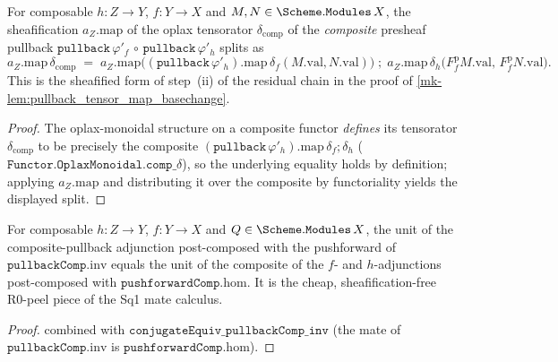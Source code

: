 \begin{lemma}\label{mk-lem:sheafifymap_deltacomp_split}
  \leanok

  For composable \(h : Z \to Y\), \(f : Y \to X\) and \(M, N \in \Scheme.\mathtt{Modules}\,X\),
  the sheafification \(a_Z.\mathrm{map}\) of the oplax tensorator \(\delta_{\mathrm{comp}}\) of
  the \emph{composite} presheaf pullback \(\mathtt{pullback}\,\varphi'_{f} \,\circ\,
  \mathtt{pullback}\,\varphi'_{h}\) splits as
  \[
    a_Z.\mathrm{map}\,\delta_{\mathrm{comp}}
      \;=\; a_Z.\mathrm{map}\bigl((\mathtt{pullback}\,\varphi'_{h}).\mathrm{map}\,
            \delta_{f}(M.\mathrm{val}, N.\mathrm{val})\bigr)
        \;\mathbin{;}\;
        a_Z.\mathrm{map}\,\delta_{h}\bigl(F^{\mathrm p}_{f}M.\mathrm{val},\,
            F^{\mathrm p}_{f}N.\mathrm{val}\bigr).
  \]
  This is the sheafified form of step~(ii) of the residual chain in the proof of
  \ref{mk-lem:pullback_tensor_map_basechange}.
\end{lemma}
\begin{proof}
  \leanok
  The oplax-monoidal structure on a composite functor \emph{defines} its tensorator
  \(\delta_{\mathrm{comp}}\) to be precisely the composite
  \((\mathtt{pullback}\,\varphi'_{h}).\mathrm{map}\,\delta_{f} \mathbin{;} \delta_{h}\)
  (\(\mathtt{Functor.OplaxMonoidal.comp\_}\delta\)), so the underlying equality holds
  by definition; applying \(a_Z.\mathrm{map}\) and distributing it over the composite by
  functoriality yields the displayed split.
\end{proof}

\begin{lemma}\label{mk-lem:sheaf_unit_comp_pushforward_pullbackcomp_inv}
  \leanok

  For composable \(h : Z \to Y\), \(f : Y \to X\) and \(Q \in \Scheme.\mathtt{Modules}\,X\),
  the unit of the composite-pullback adjunction post-composed with the pushforward of
  \(\mathtt{pullbackComp}.\mathrm{inv}\) equals the unit of the composite of the \(f\)- and
  \(h\)-adjunctions post-composed with \(\mathtt{pushforwardComp}.\mathrm{hom}\). It is the
  cheap, sheafification-free R0-peel piece of the Sq1 mate calculus.
\end{lemma}
\begin{proof}
  \leanok
  combined with \(\mathtt{conjugateEquiv\_pullbackComp\_inv}\) (the mate of
  \(\mathtt{pullbackComp}.\mathrm{inv}\) is \(\mathtt{pushforwardComp}.\mathrm{hom}\)).
\end{proof}


